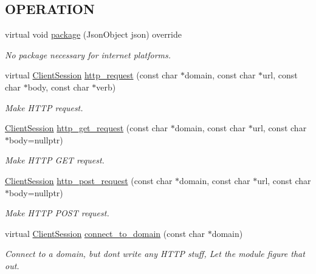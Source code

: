 \subsection*{O\+P\+E\+R\+A\+T\+I\+ON}
\begin{DoxyCompactItemize}
\item 
virtual void \hyperlink{class_loom_internet_plat_ae9cbe7ba64e4d597fe7084110f646dec}{package} (Json\+Object json) override
\begin{DoxyCompactList}\small\item\em No package necessary for internet platforms. \end{DoxyCompactList}\item 
virtual \hyperlink{class_loom_internet_plat_a7044d4ef42ec9181d519e6d37365789d}{Client\+Session} \hyperlink{class_loom_internet_plat_a01a61bd1d5ec547b2619c620abbfd983}{http\+\_\+request} (const char $\ast$domain, const char $\ast$url, const char $\ast$body, const char $\ast$verb)
\begin{DoxyCompactList}\small\item\em Make H\+T\+TP request. \end{DoxyCompactList}\item 
\hyperlink{class_loom_internet_plat_a7044d4ef42ec9181d519e6d37365789d}{Client\+Session} \hyperlink{class_loom_internet_plat_ad1a855e6ed61aa2c40ff0b8f477df57f}{http\+\_\+get\+\_\+request} (const char $\ast$domain, const char $\ast$url, const char $\ast$body=nullptr)
\begin{DoxyCompactList}\small\item\em Make H\+T\+TP G\+ET request. \end{DoxyCompactList}\item 
\hyperlink{class_loom_internet_plat_a7044d4ef42ec9181d519e6d37365789d}{Client\+Session} \hyperlink{class_loom_internet_plat_aeac1140fb30e60c0f845f36d2ff02cd8}{http\+\_\+post\+\_\+request} (const char $\ast$domain, const char $\ast$url, const char $\ast$body=nullptr)
\begin{DoxyCompactList}\small\item\em Make H\+T\+TP P\+O\+ST request. \end{DoxyCompactList}\item 
virtual \hyperlink{class_loom_internet_plat_a7044d4ef42ec9181d519e6d37365789d}{Client\+Session} \hyperlink{class_loom_internet_plat_aa89a42b49465a6924a674be2e9dac709}{connect\+\_\+to\+\_\+domain} (const char $\ast$domain)
\begin{DoxyCompactList}\small\item\em Connect to a domain, but don\textquotesingle{}t write any H\+T\+TP stuff, Let the module figure that out. \end{DoxyCompactList}\item 

\end{DoxyCompactItemize}
